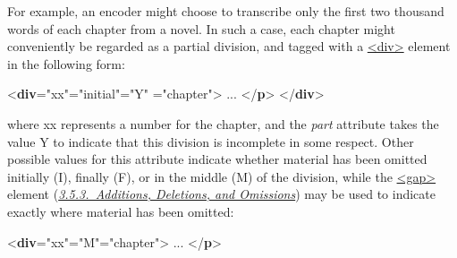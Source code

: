 \par
For example, an encoder might choose to transcribe only the first two thousand words of each chapter from a novel. In such a case, each chapter might conveniently be regarded as a partial division, and tagged with a \hyperref[TEI.div]{<div>} element in the following form: \par\bgroup{}\exampleFont \begin{shaded}\noindent\mbox{}{<\textbf{div}\hspace*{1em}{n}="{xx}"\hspace*{1em}{sample}="{initial}"\hspace*{1em}{part}="{Y}"\mbox{}\newline 
\hspace*{1em}{type}="{chapter}">}\mbox{}\newline 
{} ... {</\textbf{p}>}\mbox{}\newline 
{</\textbf{div}>}\end{shaded}\egroup\par \noindent  where xx represents a number for the chapter, and the {\itshape part} attribute takes the value Y to indicate that this division is incomplete in some respect. Other possible values for this attribute indicate whether material has been omitted initially (I), finally (F), or in the middle (M) of the division, while the \hyperref[TEI.gap]{<gap>} element (\textit{\hyperref[COEDADD]{3.5.3.\ Additions, Deletions, and Omissions}}) may be used to indicate exactly where material has been omitted: \par\bgroup{}\exampleFont \begin{shaded}\noindent\mbox{}{<\textbf{div}\hspace*{1em}{n}="{xx}"\hspace*{1em}{part}="{M}"\hspace*{1em}{type}="{chapter}">}\mbox{}\newline 
{} ... {</\textbf{p}>}\mbox{}\newline 

\end{shaded}
